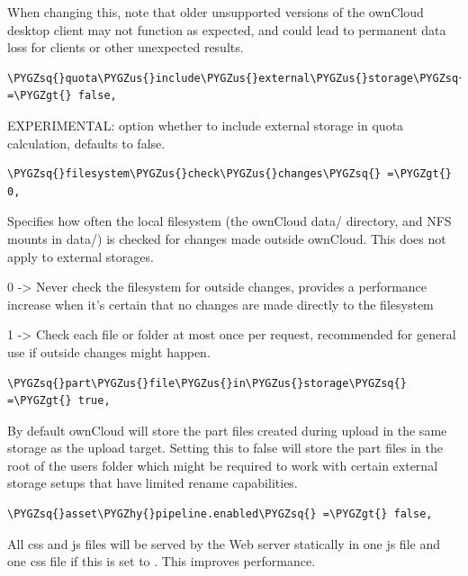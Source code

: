 \documentclass[letterpaper,10pt,english]{sphinxmanual}
\def\PYGZus{\char`\_}
\def\PYGZgt{\char`\>}
\def\PYGZhy{\char`\-}
\def\PYGZsq{\char`\'}
\renewcommand\PYGZsq{\textquotesingle}
\begin{document}
When changing this, note that older unsupported versions of the ownCloud desktop
client may not function as expected, and could lead to permanent data loss for
clients or other unexpected results.

\begin{Verbatim}[commandchars=\\\{\}]
\PYGZsq{}quota\PYGZus{}include\PYGZus{}external\PYGZus{}storage\PYGZsq{} =\PYGZgt{} false,
\end{Verbatim}

EXPERIMENTAL: option whether to include external storage in quota
calculation, defaults to false.

\begin{Verbatim}[commandchars=\\\{\}]
\PYGZsq{}filesystem\PYGZus{}check\PYGZus{}changes\PYGZsq{} =\PYGZgt{} 0,
\end{Verbatim}

Specifies how often the local filesystem (the ownCloud data/ directory, and
NFS mounts in data/) is checked for changes made outside ownCloud. This
does not apply to external storages.

0 -\textgreater{} Never check the filesystem for outside changes, provides a performance
increase when it's certain that no changes are made directly to the
filesystem

1 -\textgreater{} Check each file or folder at most once per request, recommended for
general use if outside changes might happen.

\begin{Verbatim}[commandchars=\\\{\}]
\PYGZsq{}part\PYGZus{}file\PYGZus{}in\PYGZus{}storage\PYGZsq{} =\PYGZgt{} true,
\end{Verbatim}

By default ownCloud will store the part files created during upload in the
same storage as the upload target. Setting this to false will store the part
files in the root of the users folder which might be required to work with certain
external storage setups that have limited rename capabilities.

\begin{Verbatim}[commandchars=\\\{\}]
\PYGZsq{}asset\PYGZhy{}pipeline.enabled\PYGZsq{} =\PYGZgt{} false,
\end{Verbatim}

All css and js files will be served by the Web server statically in one js
file and one css file if this is set to . This improves performance.
\end{document}
